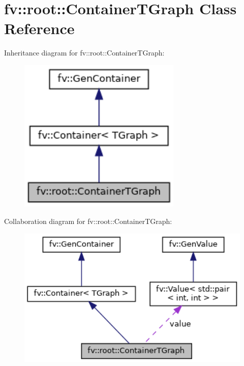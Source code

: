 \hypertarget{classfv_1_1root_1_1ContainerTGraph}{}\section{fv\+:\+:root\+:\+:Container\+T\+Graph Class Reference}
\label{classfv_1_1root_1_1ContainerTGraph}


Inheritance diagram for fv\+:\+:root\+:\+:Container\+T\+Graph\+:
\nopagebreak
\begin{figure}[H]
\begin{center}
\leavevmode
\includegraphics[width=220pt]{classfv_1_1root_1_1ContainerTGraph__inherit__graph}
\end{center}
\end{figure}


Collaboration diagram for fv\+:\+:root\+:\+:Container\+T\+Graph\+:
\nopagebreak
\begin{figure}[H]
\begin{center}
\leavevmode
\includegraphics[width=346pt]{classfv_1_1root_1_1ContainerTGraph__coll__graph}
\end{center}
\end{figure}
